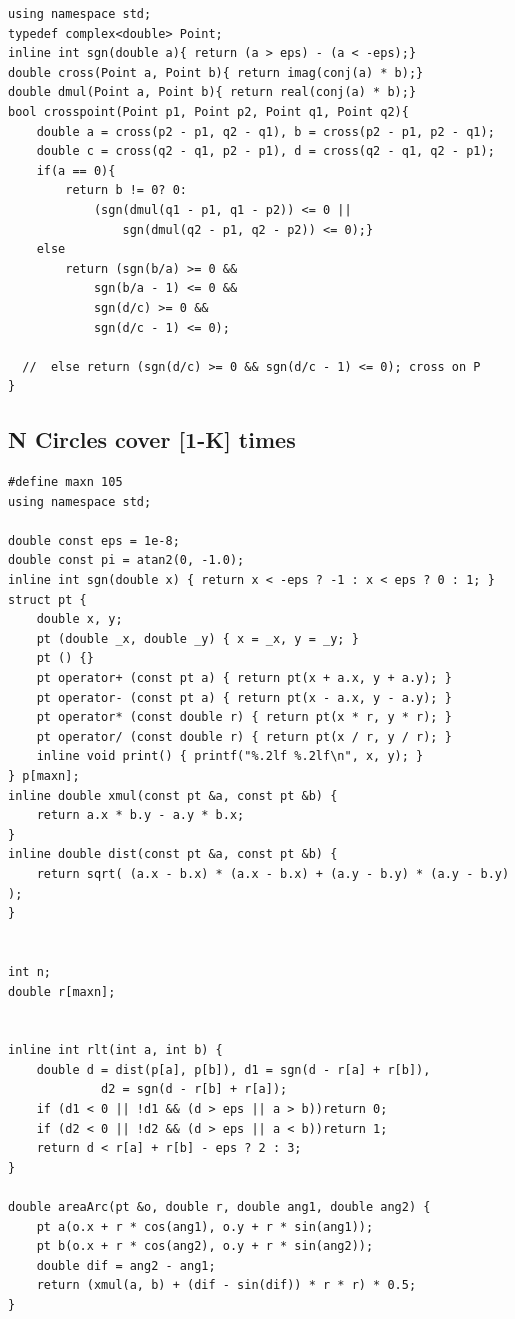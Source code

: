 \documentclass[a4paper]{article}
\begin{document}
\begin{CJK*}{UTF8}{gbsn}
\begin{multicols}{3}
\begin{flushleft}
\begin{lstlisting}
using namespace std;
typedef complex<double> Point;
inline int sgn(double a){ return (a > eps) - (a < -eps);}
double cross(Point a, Point b){ return imag(conj(a) * b);}
double dmul(Point a, Point b){ return real(conj(a) * b);}
bool crosspoint(Point p1, Point p2, Point q1, Point q2){
    double a = cross(p2 - p1, q2 - q1), b = cross(p2 - p1, p2 - q1);
    double c = cross(q2 - q1, p2 - p1), d = cross(q2 - q1, q2 - p1);
    if(a == 0){
        return b != 0? 0:
            (sgn(dmul(q1 - p1, q1 - p2)) <= 0 ||
                sgn(dmul(q2 - p1, q2 - p2)) <= 0);}
    else
        return (sgn(b/a) >= 0 &&
            sgn(b/a - 1) <= 0 &&
            sgn(d/c) >= 0 &&
            sgn(d/c - 1) <= 0);

  //  else return (sgn(d/c) >= 0 && sgn(d/c - 1) <= 0); cross on P
}
\end{lstlisting}

\subsection{N Circles cover [1-K] times}
\begin{lstlisting}
#define maxn 105
using namespace std;

double const eps = 1e-8;
double const pi = atan2(0, -1.0);
inline int sgn(double x) { return x < -eps ? -1 : x < eps ? 0 : 1; }
struct pt {
    double x, y;
    pt (double _x, double _y) { x = _x, y = _y; }
    pt () {}
    pt operator+ (const pt a) { return pt(x + a.x, y + a.y); }
    pt operator- (const pt a) { return pt(x - a.x, y - a.y); }
    pt operator* (const double r) { return pt(x * r, y * r); }
    pt operator/ (const double r) { return pt(x / r, y / r); }
    inline void print() { printf("%.2lf %.2lf\n", x, y); }
} p[maxn];
inline double xmul(const pt &a, const pt &b) {
    return a.x * b.y - a.y * b.x;
}
inline double dist(const pt &a, const pt &b) {
    return sqrt( (a.x - b.x) * (a.x - b.x) + (a.y - b.y) * (a.y - b.y) );
}


int n;
double r[maxn];


inline int rlt(int a, int b) {
	double d = dist(p[a], p[b]), d1 = sgn(d - r[a] + r[b]),
             d2 = sgn(d - r[b] + r[a]);
	if (d1 < 0 || !d1 && (d > eps || a > b))return 0;
	if (d2 < 0 || !d2 && (d > eps || a < b))return 1;
	return d < r[a] + r[b] - eps ? 2 : 3;
}

double areaArc(pt &o, double r, double ang1, double ang2) {
    pt a(o.x + r * cos(ang1), o.y + r * sin(ang1));
    pt b(o.x + r * cos(ang2), o.y + r * sin(ang2));
    double dif = ang2 - ang1;
    return (xmul(a, b) + (dif - sin(dif)) * r * r) * 0.5;
}


\end{lstlisting}
\end{flushleft}
\end{multicols}
\end{CJK*}
\end{document}

